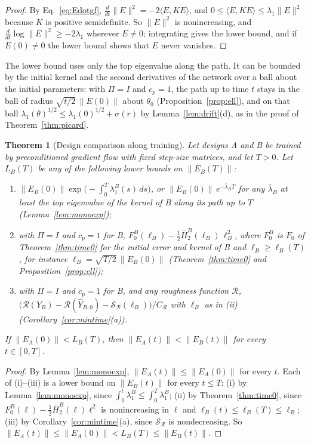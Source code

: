\documentclass[11pt]{article}
\newtheorem{theorem}{Theorem}
\theoremstyle{definition}
\theoremstyle{remark}
\newcommand{\Rgh}{\mathcal{R}}           %
\newcommand{\CR}{C_{\Rgh}}
\newcommand{\ip}[2]{\langle #1,#2\rangle}
\begin{document}
\begin{proof}
By Eq.~\eqref{eq:Edotgf}, $\frac{d}{dt}\|E\|^2 = -2\ip{E}{KE}$, and $0\le\ip{E}{KE}\le\lambda_1\|E\|^2$ because $K$ is positive semidefinite.
So $\|E\|^2$ is nonincreasing, and $\frac{d}{dt}\log\|E\|^2\ge-2\lambda_1$ wherever $E\neq0$; integrating gives the lower bound, and if $E(0)\neq0$ the lower bound shows that $E$ never vanishes.
\end{proof}

The lower bound uses only the top eigenvalue along the path.
It can be bounded by the initial kernel and the second derivatives of the network over a ball about the initial parameters: with $\Pi = I$ and $c_p = 1$, the path up to time $t$ stays in the ball of radius $\sqrt{t/2}\,\|E(0)\|$ about $\theta_0$ (Proposition~\ref{prop:ell}), and on that ball $\lambda_1(\theta)^{1/2}\le\lambda_1(0)^{1/2} + \sigma(r)$ by Lemma~\ref{lem:drift}(d), as in the proof of Theorem~\ref{thm:picard}.

\begin{theorem}[Design comparison along training]\label{thm:designcompare}
Let designs A and B be trained by preconditioned gradient flow with fixed step-size matrices, and let $T > 0$.
Let $L_B(T)$ be any of the following lower bounds on $\|E_B(T)\|$:
\begin{enumerate}[label=(\roman*)]
\item $\|E_B(0)\|\exp\big(-\int_0^T\lambda_1^B(s)\,ds\big)$, or $\|E_B(0)\|\,e^{-\bar\lambda_BT}$ for any $\bar\lambda_B$ at least the top eigenvalue of the kernel of B along its path up to $T$ (Lemma~\ref{lem:monoexp});
\item with $\Pi = I$ and $c_p = 1$ for B, $F_0^B(\ell_B) - \tfrac12\bar H_2^B(\ell_B)\,\ell_B^2$, where $F_0^B$ is $F_0$ of Theorem~\ref{thm:time0} for the initial error and kernel of B and $\ell_B\ge\ell_B(T)$, for instance $\ell_B = \sqrt{T/2}\,\|E_B(0)\|$ (Theorem~\ref{thm:time0} and Proposition~\ref{prop:ell});
\item with $\Pi = I$ and $c_p = 1$ for B, and any roughness function $\Rgh$, $\big(\Rgh(Y_B) - \Rgh(\hat Y_{B,0}) - \mathcal{S}_\Rgh(\ell_B)\big)/\CR$ with $\ell_B$ as in (ii) (Corollary~\ref{cor:mintime}(a)).
\end{enumerate}
If $\|E_A(0)\| < L_B(T)$, then $\|E_A(t)\| < \|E_B(t)\|$ for every $t\in[0,T]$.
\end{theorem}

\begin{proof}
By Lemma~\ref{lem:monoexp}, $\|E_A(t)\|\le\|E_A(0)\|$ for every $t$.
Each of (i)--(iii) is a lower bound on $\|E_B(t)\|$ for every $t\le T$: (i) by Lemma~\ref{lem:monoexp}, since $\int_0^t\lambda_1^B\le\int_0^T\lambda_1^B$; (ii) by Theorem~\ref{thm:time0}, since $F_0^B(\ell) - \tfrac12\bar H_2^B(\ell)\ell^2$ is nonincreasing in $\ell$ and $\ell_B(t)\le\ell_B(T)\le\ell_B$; (iii) by Corollary~\ref{cor:mintime}(a), since $\mathcal{S}_\Rgh$ is nondecreasing.
So $\|E_A(t)\|\le\|E_A(0)\| < L_B(T)\le\|E_B(t)\|$.
\end{proof}
\end{document}
